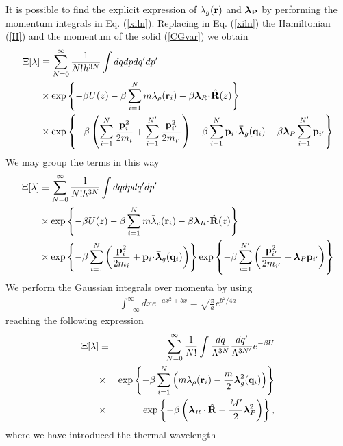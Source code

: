 \documentclass[b5paper,openright,11pt]{book}
\newcommand{\esc}{\!\cdot\!}
\begin{document}
It is possible to find the explicit expression of $\lambda_{g}({\bf r})$ and $\boldsymbol{\lambda}_{\bf P}$ by performing the momentum integrals in Eq. (\ref{xiln}). Replacing in Eq. (\ref{xiln}) the Hamiltonian (\ref{H}) and the momentum of the solid (\ref{CGvar}) we obtain 
\begin{align}
\Xi[\lambda]
&\equiv
\sum_{N=0}^\infty \frac{1}{N!h^{3N}}
\int dqdpdq'dp'
\nonumber \\
&\times\exp\left\{-\beta U(z)-\beta \sum_{i=1}^Nm\bar{\lambda}_\rho({\bf
    r}_i) -\beta \boldsymbol{\lambda}_{R}\esc\hat{\bf R}(z) \right\}
\nonumber \\
&\times
\exp\left\{-\beta \left(\sum_{i=1}^N\frac{{\bf p}_i^2}{2m_i} + \sum_{i=1}^{N'}\frac{{\bf p}_{i'}^2}{2m_{i'}} \right) - \beta \sum_{i=1}^N{\bf p}_i\esc\boldsymbol{\bar{\lambda}}_g({\bf q}_i) 
-\beta \boldsymbol{\lambda}_P\sum_{i=1}^{N'}{\bf p}_{i'}\right\}
\end{align}
We may group the terms in this way
\begin{align}
\Xi[\lambda]
&\equiv
\sum_{N=0}^\infty \frac{1}{N!h^{3N}}
\int dqdpdq'dp'
\nonumber \\
&\times\exp\left\{-\beta U(z)-\beta \sum_{i=1}^Nm\bar{\lambda}_\rho({\bf
    r}_i) -\beta \boldsymbol{\lambda}_{R}\esc\hat{\bf R}(z) \right\}
\nonumber \\
&\times
\exp\left\{-\beta \sum_{i=1}^N\left(\frac{{\bf p}_i^2}{2m_i} + {\bf p}_i\esc\boldsymbol{\bar{\lambda}}_g({\bf q}_i)\right)\right\}
\exp\left\{-\beta \sum_{i=1}^{N'}\left(\frac{{\bf p}_{i'}^2}{2m_{i'}} + \boldsymbol{\lambda}_P{\bf p}_{i'}\right) \right\}
\end{align}
We perform the Gaussian integrals over momenta by using 
\begin{align}
\int_{-\infty}^{\infty} dx e^{-ax^2+bx}=\sqrt{\frac{\pi}{a}}e^{b^2/4a} 
\end{align}
reaching the following expression 
\begin{eqnarray}
\Xi [\lambda]
&\equiv&
 \sum_{N=0}^\infty \frac{1}{N!}
\int \frac{dq}{\Lambda^{3N}}\frac{dq'}{\Lambda^{3N'}}e^{-\beta U}
\nonumber\\
&\times&\exp\left\{-\beta \sum_{i=1}^N\left(m\lambda_\rho({\bf
    r}_i)-\frac{m}{2}\boldsymbol{\lambda}_{g}^2({\bf q}_i)\right)\right\}
\nonumber\\
&\times&\exp\left\{-\beta \left(\boldsymbol{\lambda}_R\cdot\hat{\bf R}-\frac{M'}{2}\boldsymbol{\lambda}_{P}^2\right)\right\},
\label{xiln2}
\end{eqnarray}
where we have introduced the thermal wavelength 
\end{document}
